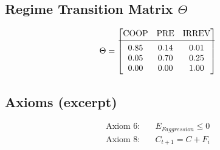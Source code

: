 \subsection{Regime Transition Matrix $\Theta$}
\begin{equation}
\Theta = \begin{bmatrix}
\text{COOP} & \text{PRE} & \text{IRREV} \\
\midrule
0.85 & 0.14 & 0.01 \\
0.05 & 0.70 & 0.25 \\
0.00 & 0.00 & 1.00 \\
\end{bmatrix}
\end{equation}

\subsection{Axioms (excerpt)}
\begin{align}
\text{Axiom 6:} \quad & E_{F aggression} \leq 0 \\
\text{Axiom 8:} \quad & C_{t+1} = C + F_{i}
\end{align}
